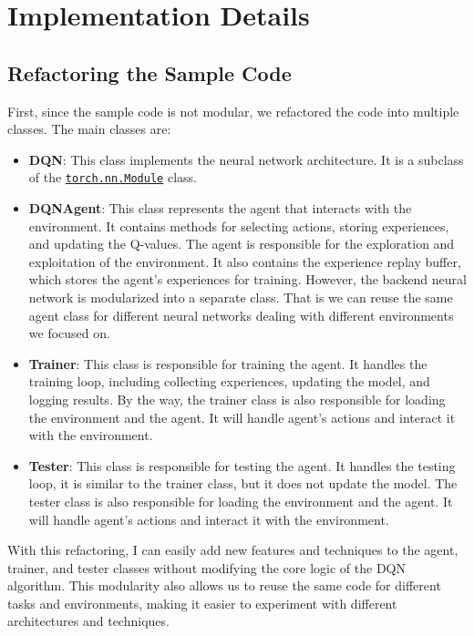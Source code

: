 \section{Implementation Details}
\label{sec:implementation}

\subsection{Refactoring the Sample Code}

First, since the sample code is not modular, we refactored the code into multiple classes. The main classes are:
\begin{itemize}
      \item \textbf{DQN}: This class implements the neural network architecture. It is a subclass of the \href{https://pytorch.org/docs/stable/generated/torch.nn.Module.html#torch.nn.Module}{\texttt{torch.nn.Module}} class.
      \item \textbf{DQNAgent}: This class represents the agent that interacts with the environment. It contains methods for selecting actions, storing experiences, and updating the Q-values.
            The agent is responsible for the exploration and exploitation of the environment.
            It also contains the experience replay buffer, which stores the agent's experiences for training.
            However, the backend neural network is modularized into a separate class. That is we can reuse the same agent class for different neural networks dealing with different environments we focused on.
      \item \textbf{Trainer}: This class is responsible for training the agent. It handles the training loop, including collecting experiences, updating the model, and logging results.
            By the way, the trainer class is also responsible for loading the environment and the agent. It will handle agent's actions and interact it with the environment.
      \item \textbf{Tester}: This class is responsible for testing the agent. It handles the testing loop, it is similar to the trainer class, but it does not update the model.
            The tester class is also responsible for loading the environment and the agent. It will handle agent's actions and interact it with the environment.
\end{itemize}

With this refactoring, I can easily add new features and techniques to the agent, trainer, and tester classes without modifying the core logic of the DQN algorithm.
This modularity also allows us to reuse the same code for different tasks and environments, making it easier to experiment with different architectures and techniques.

